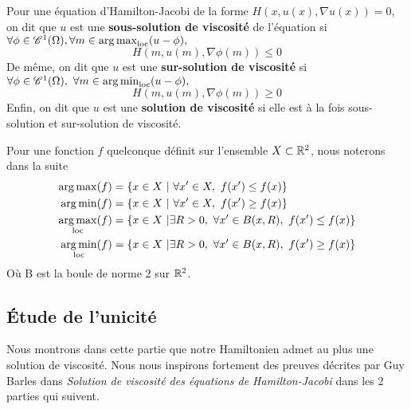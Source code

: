 \begin{definition}
    Pour une équation d'Hamilton-Jacobi de la forme $H(x,u(x),\nabla u(x))=0$, on dit que $u$ est une \textbf{sous-solution de viscosité} de l'équation si $\forall \phi \in \mathscr{C}^1(\Omega), \forall m\in \operatorname*{arg\,max}_{\text{loc}}(u-\phi),$
    \begin{equation*}
        H(m,u(m),\nabla \phi(m))\le 0
    \end{equation*}  
    De même, on dit que $u$ est une \textbf{sur-solution de viscosité} si $\forall \phi \in \mathscr{C}^1(\Omega), \ \forall m\in\operatorname*{arg\,min}_{\text{loc}}(u-\phi),$
    \begin{equation*}
        H(m,u(m),\nabla \phi(m))\ge 0
    \end{equation*}
    Enfin, on dit que $u$ est une \textbf{solution de viscosité} si elle est à la fois sous-solution et sur-solution de viscosité.
\end{definition}
\newpage
\begin{noremark}
    Pour une fonction $f$ quelconque définit sur l'ensemble $X\subset\mathbb{R}^2$, nous noterons dans la suite 
    \begin{align*}
        \argmax(f) &= \{ x \in X \ | \ \forall x' \in X,\ f(x') \leq f(x)\} \\
        \argmin(f) &= \{ x \in X \ | \ \forall x' \in X,\ f(x') \geq f(x)\}
        \\
        \argmax_{\text{loc}}(f) &= \{ x \in X \ |\exists R>0, \ \forall x' \in B(x,R),\ f(x') \leq f(x)\} \\
        \argmin_{\text{loc}}(f) &= \{ x \in X \ |\exists R>0, \ \forall x' \in B(x,R),\ f(x') \geq f(x)\}
    \end{align*}
    Où B est la boule de norme 2 sur $\mathbb{R}^2$.
\end{noremark}


\subsection{Étude de l'unicité}

Nous montrons dans cette partie que notre Hamiltonien admet au plus une solution de viscosité. Nous nous inspirons fortement des preuves décrites par Guy Barles dans \textit{Solution de viscosité des équations de Hamilton-Jacobi} \cite{Barles} dans les 2 parties qui suivent.

